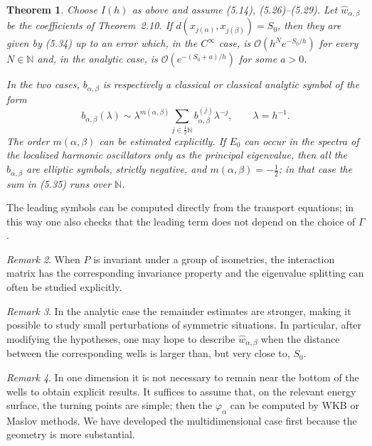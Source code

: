 \documentclass[11pt,a4paper]{article}
\newcommand{\N}{\mathbb N}
\newcommand{\cO}{\mathcal O}
\numberwithin{equation}{section}
\newtheorem{theorem}{Theorem}[section]
\theoremstyle{remark}
\newtheorem{remark}[theorem]{Remark}
\begin{document}
\begin{theorem}
Choose $I(h)$ as above and assume (5.14), (5.26)--(5.29). Let $\widehat w_{\alpha,\beta}$ be the coefficients of Theorem~2.10. If $d(x_{j(\alpha)},x_{j(\beta)})=S_0$, then they are given by (5.34) up to an error which, in the $C^\infty$ case, is $\cO(h^N e^{-S_0/h})$ for every $N\in\N$ and, in the analytic case, is $\cO(e^{-(S_0+a)/h})$ for some $a>0$.

In the two cases, $b_{\alpha,\beta}$ is respectively a classical or classical analytic symbol of the form
\begin{equation}
b_{\alpha,\beta}(\lambda)
\sim \lambda^{m(\alpha,\beta)}
\sum_{j\in\frac12\N}b_{\alpha,\beta}^{(j)}\lambda^{-j},
\qquad \lambda=h^{-1}.
\tag{5.35}
\end{equation}
The order $m(\alpha,\beta)$ can be estimated explicitly. If $E_0$ can occur in the spectra of the localized harmonic oscillators only as the principal eigenvalue, then all the $b_{\alpha,\beta}$ are elliptic symbols, strictly negative, and $m(\alpha,\beta)=-\frac12$; in that case the sum in (5.35) runs over $\N$.
\end{theorem}

The leading symbols can be computed directly from the transport equations; in this way one also checks that the leading term does not depend on the choice of $\Gamma$.

\begin{remark}
When $P$ is invariant under a group of isometries, the interaction matrix has the corresponding invariance property and the eigenvalue splitting can often be studied explicitly.
\end{remark}

\begin{remark}
In the analytic case the remainder estimates are stronger, making it possible to study small perturbations of symmetric situations. In particular, after modifying the hypotheses, one may hope to describe $\widehat w_{\alpha,\beta}$ when the distance between the corresponding wells is larger than, but very close to, $S_0$.
\end{remark}

\begin{remark}
In one dimension it is not necessary to remain near the bottom of the wells to obtain explicit results. It suffices to assume that, on the relevant energy surface, the turning points are simple; then the $\varphi_\alpha$ can be computed by WKB or Maslov methods. We have developed the multidimensional case first because the geometry is more substantial.
\end{remark}
\end{document}
